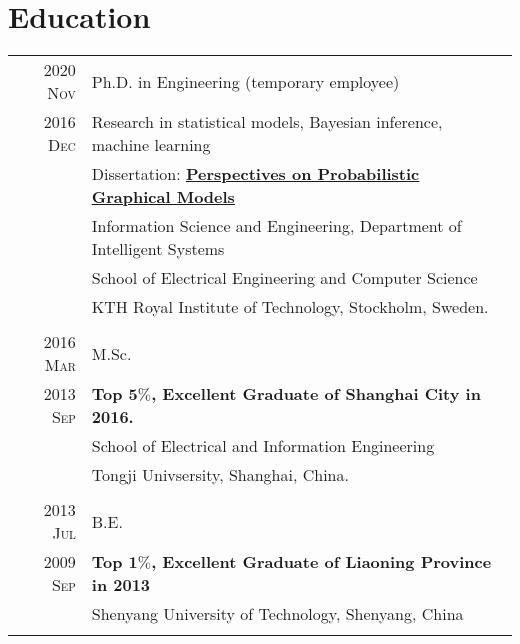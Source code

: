 \documentclass[a4paper,10pt]{article}
\begin{document}

\section{Education}

\begin{tabular}{r|p{13cm}}

  \textsc{2020 Nov} 	& Ph.D. in Engineering (temporary employee)\\
  \textsc{2016 Dec} 	& {Research in statistical models, Bayesian inference, machine learning} \\
                      & {Dissertation: \href{https://github.com/FirstHandScientist/phdthesis}{\textbf{Perspectives on Probabilistic Graphical Models}}} \\
                      & { Information Science and Engineering, Department of Intelligent Systems
                        } \\
                      & {School of Electrical Engineering and Computer Science} \\
                      & {KTH Royal Institute of Technology, Stockholm, Sweden.} \\
  \multicolumn{2}{c}{} \\


  \textsc{2016 Mar} 	& M.Sc. \\
  \textsc{2013 Sep}  & \textbf{Top $\mathbf{5\%}$, Excellent Graduate of Shanghai City in 2016.}\\
                      & {School of Electrical and Information Engineering} \\
                      & {Tongji Univsersity, Shanghai, China.}\\
  \multicolumn{2}{c}{} \\


  \textsc{2013 Jul} 	& B.E. \\
  \textsc{2009 Sep} & \textbf{Top $\mathbf{1\%}$, Excellent Graduate of Liaoning Province in 2013}\\
                      & {Shenyang University of Technology, Shenyang, China} \\
  \multicolumn{2}{c}{}\\

\end{tabular}
\end{document}
